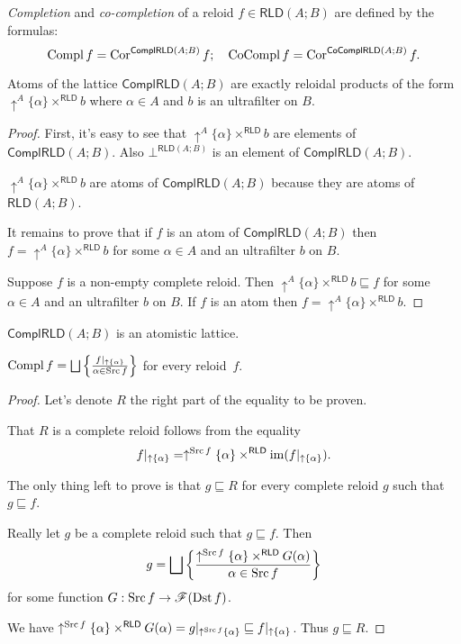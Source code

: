 \begin{defn}
\emph{Completion}
and \emph{co-completion} of a reloid $f\in\mathsf{RLD}(A;B)$ are
defined by the formulas:
\[
\operatorname{Compl} f=\operatorname{Cor}^{\mathsf{ComplRLD}(A;B)}f;\quad\operatorname{CoCompl} f=\operatorname{Cor}^{\mathsf{CoComplRLD}(A;B)}f.
\]
\end{defn}
\begin{thm}
Atoms of the lattice $\mathsf{ComplRLD}(A;B)$ are exactly reloidal
products of the form $\uparrow^{A}\{\alpha\}\times^{\mathsf{RLD}}b$
where $\alpha\in A$ and $b$ is an ultrafilter on $B$.\end{thm}
\begin{proof}
First, it's easy to see that $\uparrow^{A}\{\alpha\}\times^{\mathsf{RLD}}b$
are elements of $\mathsf{ComplRLD}(A;B)$. Also $\bot^{\mathsf{RLD}(A;B)}$
is an element of $\mathsf{ComplRLD}(A;B)$.

$\uparrow^{A}\{\alpha\}\times^{\mathsf{RLD}}b$ are atoms of $\mathsf{ComplRLD}(A;B)$
because they are atoms of $\mathsf{RLD}(A;B)$.

It remains to prove that if $f$ is an atom of $\mathsf{ComplRLD}(A;B)$
then $f=\uparrow^{A}\{\alpha\}\times^{\mathsf{RLD}}b$ for some $\alpha\in A$
and an ultrafilter $b$ on $B$.

Suppose $f$ is a non-empty complete reloid. Then $\uparrow^{A}\{\alpha\}\times^{\mathsf{RLD}}b\sqsubseteq f$
for some $\alpha\in A$ and an ultrafilter $b$ on $B$. If $f$ is
an atom then $f=\uparrow^{A}\{\alpha\}\times^{\mathsf{RLD}}b$.\end{proof}
\begin{obvious}
$\mathsf{ComplRLD}(A;B)$ is an atomistic lattice.\end{obvious}
\begin{prop}
$\operatorname{Compl} f=\bigsqcup\left\{ \frac{f|_{\uparrow \{\alpha\}}}{\alpha\in\operatorname{Src} f}\right\}$
for every reloid~$f$.\end{prop}
\begin{proof}
Let's denote $R$ the right part of the equality to be proven.

That $R$ is a complete reloid follows from the equality
\[
f|_{\uparrow \{\alpha\}}=\uparrow^{\operatorname{Src} f}\{\alpha\}\times^{\mathsf{RLD}}\operatorname{im}(f|_{\uparrow \{\alpha\}}).
\]


The only thing left to prove is that $g\sqsubseteq R$ for every complete
reloid $g$ such that $g\sqsubseteq f$.

Really let $g$ be a complete reloid such that $g\sqsubseteq f$.
Then
\[
g=\bigsqcup\left\{ \frac{\uparrow^{\operatorname{Src} f}\{\alpha\}\times^{\mathsf{RLD}}G(\alpha)}{\alpha\in\operatorname{Src} f}\right\}
\]
for some function $G:\operatorname{Src} f\rightarrow\mathscr{F}(\operatorname{Dst} f)$.

We have $\uparrow^{\operatorname{Src} f}\{\alpha\}\times^{\mathsf{RLD}}G(\alpha)=g|_{\uparrow^{\operatorname{Src} f}\{\alpha\}}\sqsubseteq f|_{\uparrow \{\alpha\}}$.
Thus $g\sqsubseteq R$.\end{proof}
